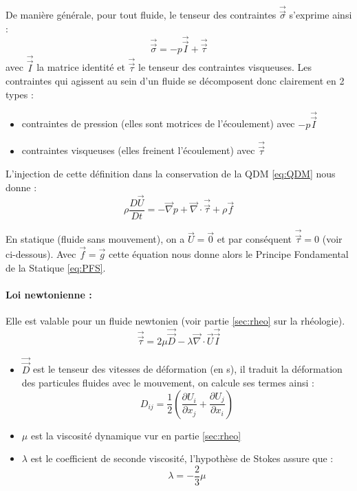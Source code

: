 
De manière générale, pour tout fluide, le tenseur des contraintes $\vec{\vec{\sigma}}$ s'exprime ainsi :
%
\begin{equation}
    \vec{\vec{\sigma}} = - p \vec{\vec{I}} + \vec{\vec{\tau}}
\end{equation}
%
avec $\vec{\vec{I}}$ la matrice identité et $\vec{\vec{\tau}}$ le tenseur des contraintes visqueuses. Les contraintes qui agissent au sein d'un fluide se décomposent donc clairement en 2 types :
%
\begin{itemize}
    \item contraintes de pression (elles sont motrices de l'écoulement) avec $- p \vec{\vec{I}}$
    \item contraintes visqueuses (elles freinent l'écoulement) avec $\vec{\vec{\tau}}$
\end{itemize}

L'injection de cette définition dans la conservation de la QDM \eqref{eq:QDM} nous donne :
%
\begin{equation}
    \rho \frac{D\vec{U}}{Dt}
    = - \vec{\nabla} p
    + \vec{\nabla} \cdot \vec{\vec{\tau}}
    + \rho \vec{f}
\end{equation}

En statique (fluide sans mouvement), on a $\vec{U} = \vec{0}$ et par conséquent $\vec{\vec{\tau}} = 0$ (voir ci-dessous). Avec $\vec{f} = \vec{g}$ cette équation nous donne alors le Principe Fondamental de la Statique \eqref{eq:PFS}.

\paragraph{Loi newtonienne :}Elle est valable pour un fluide newtonien (voir partie \ref{sec:rheo} sur la rhéologie).
%
\begin{equation}
    \vec{\vec{\tau}} = 2\mu \vec{\vec{D}}
                       - \lambda \vec{\nabla} \cdot \vec{U} \vec{\vec{I}}
\end{equation}
%
\begin{itemize}
    \item $\vec{\vec{D}}$ est le tenseur des vitesses de déformation (en s), il traduit la déformation des particules fluides avec le mouvement, on calcule ses termes ainsi :
%
    \begin{equation}
        D_{ij} = \frac{1}{2} \left( \frac{\partial{U_i}}{\partial{x_j}}
                                  + \frac{\partial{U_j}}{\partial{x_i}} \right)
    \end{equation}

    \item $\mu$ est la viscosité dynamique vur en partie \ref{sec:rheo}
    \item $\lambda$ est le coefficient de seconde viscosité, l'hypothèse de Stokes assure que :
    \begin{equation}
        \lambda = - \frac{2}{3} \mu
    \end{equation}
\end{itemize}

